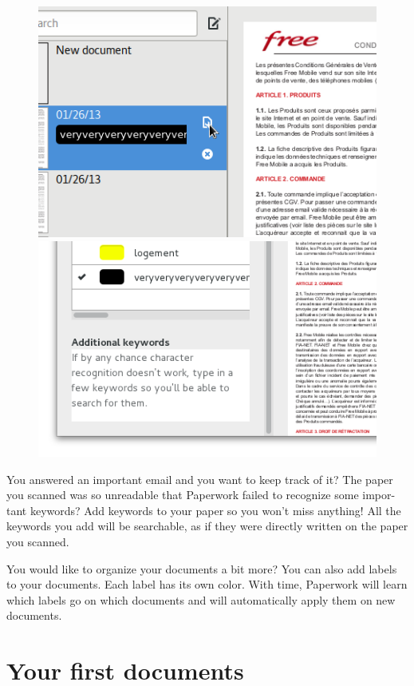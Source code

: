 \documentclass[10pt,a4paper]{article}
\begin{document}
\begin{figure}[h]
	\centering
	\includegraphics[scale=0.3]{data/paperwork_goto_labels_and_memo.png}
	\includegraphics[scale=0.3]{data/paperwork_label_and_memo.png}
\end{figure}

You answered an important email and you want to keep track of it? The paper
you scanned was so unreadable that Paperwork failed to recognize some impor-
tant keywords? Add keywords to your paper so you won't miss anything! All
the keywords you add will be searchable, as if they were directly written on
the paper you scanned.

You would like to organize your documents a bit more? You can also add labels
to your documents. Each label has its own color. With time, Paperwork will
learn which labels go on which documents and will automatically apply them
on new documents.


\section{Your first documents}
\end{document}
